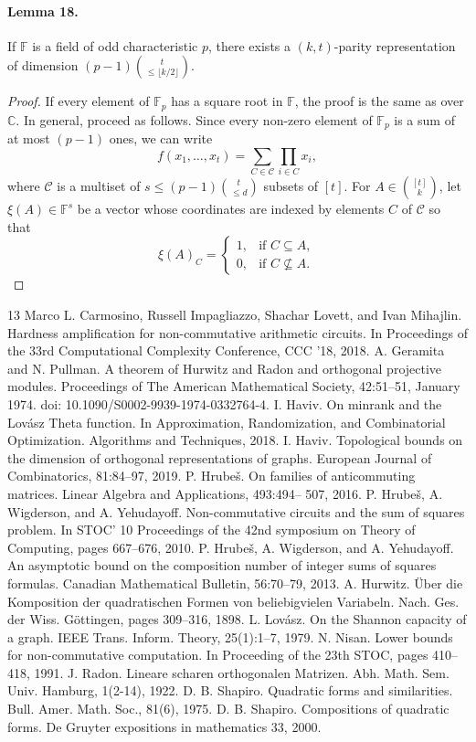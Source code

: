 \documentclass[10pt,a4paper]{article}
\begin{document}
\paragraph{Lemma 18.} If $\mathbb F$ is a field of odd characteristic $p$, there exists a $(k,t)$-parity representation of dimension $(p-1)\binom t{\le\lfloor k/2\rfloor}$.
\begin{proof}
If every element of $\mathbb F_p$ has a square root in $\mathbb F$, the proof is the same as over $\mathbb C$. In general, proceed as follows. Since every non-zero element of $\mathbb F_p$ is a sum of at most $(p-1)$ ones, we can write
\[f(x_1,\ldots,x_t)=\sum_{C\in\mathcal C}\prod_{i\in C}x_i,\]
where $\mathcal C$ is a multiset of $s\le(p-1)\binom t{\le d}$ subsets of $[t]$. For $A\in\binom{[t]}k$, let $\xi(A)\in\mathbb F^s$ be a vector whose coordinates are indexed by elements $C$ of $\mathcal C$ so that
\[\xi(A)_C=\begin{cases}1,&\text{if }C\subseteq A,\\0,&\text{if }C\not\subseteq A.\end{cases}\]
\end{proof}

\begin{thebibliography}{13}
 Marco L. Carmosino, Russell Impagliazzo, Shachar Lovett, and Ivan Mihajlin. Hardness amplification for non-commutative arithmetic circuits. In Proceedings of the 33rd Computational Complexity Conference, CCC ’18, 2018.
 A. Geramita and N. Pullman. A theorem of Hurwitz and Radon and orthogonal projective modules. Proceedings of The American Mathematical Society, 42:51–51, January 1974. doi: 10.1090/S0002-9939-1974-0332764-4.
 I. Haviv. On minrank and the Lovász Theta function. In Approximation, Randomization, and Combinatorial Optimization. Algorithms and Techniques, 2018.
 I. Haviv. Topological bounds on the dimension of orthogonal representations of graphs. European Journal of Combinatorics, 81:84–97, 2019.
 P. Hrubeš. On families of anticommuting matrices. Linear Algebra and Applications, 493:494– 507, 2016.
 P. Hrubeš, A. Wigderson, and A. Yehudayoff. Non-commutative circuits and the sum of squares problem. In STOC’ 10 Proceedings of the 42nd symposium on Theory of Computing, pages 667–676, 2010.
 P. Hrubeš, A. Wigderson, and A. Yehudayoff. An asymptotic bound on the composition number of integer sums of squares formulas. Canadian Mathematical Bulletin, 56:70–79, 2013.
 A. Hurwitz. Über die Komposition der quadratischen Formen von beliebigvielen Variabeln. Nach. Ges. der Wiss. Göttingen, pages 309–316, 1898.
 L. Lovász. On the Shannon capacity of a graph. IEEE Trans. Inform. Theory, 25(1):1–7, 1979.
 N. Nisan. Lower bounds for non-commutative computation. In Proceeding of the 23th STOC, pages 410–418, 1991.
 J. Radon. Lineare scharen orthogonalen Matrizen. Abh. Math. Sem. Univ. Hamburg, 1(2-14), 1922.
 D. B. Shapiro. Quadratic forms and similarities. Bull. Amer. Math. Soc., 81(6), 1975.
 D. B. Shapiro. Compositions of quadratic forms. De Gruyter expositions in mathematics 33, 2000.
\end{thebibliography}
\end{document}
